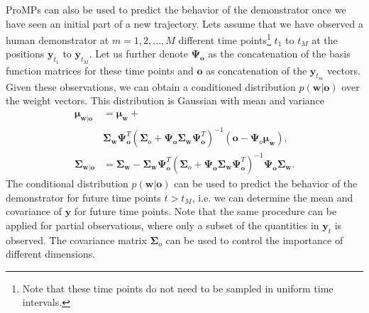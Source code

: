 \documentclass[letterpaper, 10 pt, conference]{ieeeconf}  %
\renewcommand{\vec}[1]{\ensuremath{\boldsymbol{#1}}}
\begin{document}
ProMPs can also be used to predict the behavior of the demonstrator once we have seen an initial part of a new trajectory. 
Lets assume that we have observed a human demonstrator at $m=1,2, ..., M$ different time points\footnote{Note that these time points do not need to be sampled in uniform time intervals.} 
$t_1$ to $t_M$ at the positions $\vec y_{t_1}$ to $\vec y_{t_M}$. 
Let us further denote $\vec \Psi_{\vec o}$ as the concatenation of the basis function matrices for these time points 
and $\vec o$ as concatenation of the $\vec y_{t_m}$ vectors. 
Given these observations,
we can obtain a conditioned distribution $p(\vec w| \vec o)$ over the weight vectors. 
This distribution is Gaussian with mean and variance
\begin{align}
\boldsymbol{\mu}_{\vec w| \vec o} & =  \boldsymbol{\mu}_{\vec w} + \nonumber \\ 
                                  & \boldsymbol{\Sigma}_{\vec w}\boldsymbol{\Psi}_{\vec o}^T\left(\boldsymbol{\Sigma}_o + \boldsymbol{\Psi}_{\vec o}\boldsymbol{\Sigma}_{\vec w}\boldsymbol{\Psi}_{\vec o}^T\right)^{-1}\left(\vec o -\boldsymbol{\Psi}_{o}\boldsymbol{\mu}_{\vec w}\right),  \label{eq:conditioningProMP1}\\
\boldsymbol{\Sigma}_{\vec w|\vec o} & =  \boldsymbol{\Sigma}_{\vec w}-\boldsymbol{\Sigma}_{\vec w}\boldsymbol{\Psi}_{\vec o}^T\left(\boldsymbol{\Sigma}_o +\boldsymbol{\Psi}_{\vec o}\boldsymbol{\Sigma}_{\vec w}\boldsymbol{\Psi}_{\vec o}^T\right)^{-1}\boldsymbol{\Psi}_{\vec o} \boldsymbol{\Sigma}_{\vec w}. 
\label{eq:conditioningProMP2}
\end{align}
The conditional distribution  $p(\vec w| \vec o)$ can be used to predict the behavior of the demonstrator for future time points $t > t_M$, 
i.e. we can determine the mean and covariance of $\vec y$ for future time points. 
Note that the same procedure can be applied for partial observations, 
where only a subset of the quantities in $\vec y_t$ is observed. 
The covariance matrix $\boldsymbol{\Sigma}_o$ can be used to control the importance of different dimensions.

\end{document}
